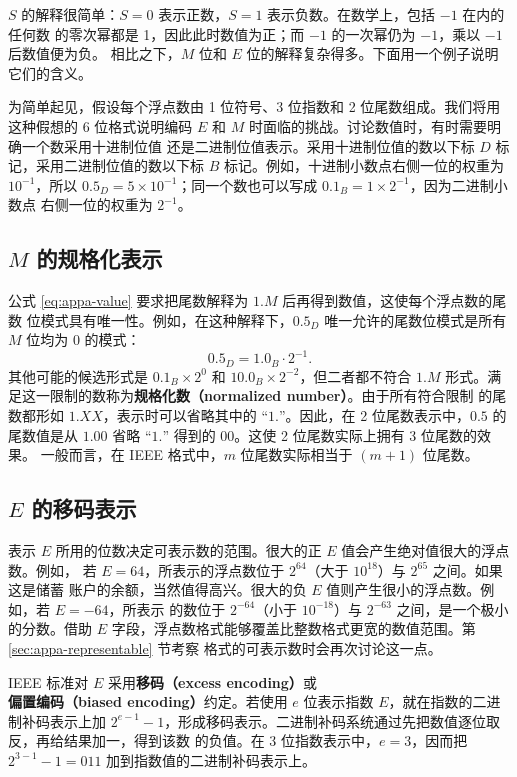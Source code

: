 $S$ 的解释很简单：$S=0$ 表示正数，$S=1$ 表示负数。在数学上，包括 $-1$ 在内的任何数
的零次幂都是 1，因此此时数值为正；而 $-1$ 的一次幂仍为 $-1$，乘以 $-1$ 后数值便为负。
相比之下，$M$ 位和 $E$ 位的解释复杂得多。下面用一个例子说明它们的含义。

为简单起见，假设每个浮点数由 1 位符号、3 位指数和 2 位尾数组成。我们将用这种假想的
6 位格式说明编码 $E$ 和 $M$ 时面临的挑战。讨论数值时，有时需要明确一个数采用十进制位值
还是二进制位值表示。采用十进制位值的数以下标 $D$ 标记，采用二进制位值的数以下标 $B$
标记。例如，十进制小数点右侧一位的权重为 $10^{-1}$，所以
$0.5_D=5\times10^{-1}$；同一个数也可以写成 $0.1_B=1\times2^{-1}$，因为二进制小数点
右侧一位的权重为 $2^{-1}$。

\subsection*{$M$ 的规格化表示}

公式 \eqref{eq:appa-value} 要求把尾数解释为 $1.M$ 后再得到数值，这使每个浮点数的尾数
位模式具有唯一性。例如，在这种解释下，$0.5_D$ 唯一允许的尾数位模式是所有 $M$ 位均为
0 的模式：
\[
  0.5_D=1.0_B\cdot2^{-1}.
\]
其他可能的候选形式是 $0.1_B\times2^0$ 和 $10.0_B\times2^{-2}$，但二者都不符合 $1.M$
形式。满足这一限制的数称为\textbf{规格化数（normalized number）}。由于所有符合限制
的尾数都形如 $1.XX$，表示时可以省略其中的 ``$1.$''。因此，在 2 位尾数表示中，$0.5$ 的
尾数值是从 $1.00$ 省略 ``$1.$'' 得到的 $00$。这使 2 位尾数实际上拥有 3 位尾数的效果。
一般而言，在 IEEE 格式中，$m$ 位尾数实际相当于 $(m+1)$ 位尾数。

\subsection*{$E$ 的移码表示}

表示 $E$ 所用的位数决定可表示数的范围。很大的正 $E$ 值会产生绝对值很大的浮点数。例如，
若 $E=64$，所表示的浮点数位于 $2^{64}$（大于 $10^{18}$）与 $2^{65}$ 之间。如果这是储蓄
账户的余额，当然值得高兴。很大的负 $E$ 值则产生很小的浮点数。例如，若 $E=-64$，所表示
的数位于 $2^{-64}$（小于 $10^{-18}$）与 $2^{-63}$ 之间，是一个极小的分数。借助 $E$
字段，浮点数格式能够覆盖比整数格式更宽的数值范围。第 \ref{sec:appa-representable} 节考察
格式的可表示数时会再次讨论这一点。

IEEE 标准对 $E$ 采用\textbf{移码（excess encoding）}或\textbf{偏置编码（biased
encoding）}约定。若使用 $e$ 位表示指数 $E$，就在指数的二进制补码表示上加
$2^{e-1}-1$，形成移码表示。二进制补码系统通过先把数值逐位取反，再给结果加一，得到该数
的负值。在 3 位指数表示中，$e=3$，因而把 $2^{3-1}-1=011$ 加到指数值的二进制补码表示上。

